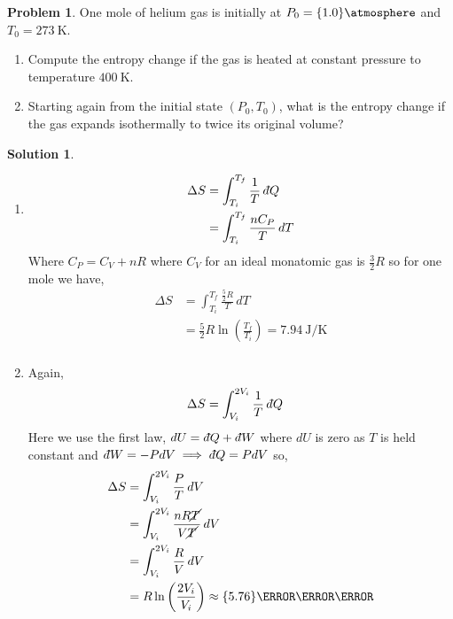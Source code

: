 \documentclass[10pt]{article}
\theoremstyle{definition}
\newtheorem{problem}{Problem}
\newtheorem{soln}{Solution}
\newcommand{\dbar}{d\hspace*{-0.08em}\bar{}\hspace*{0.1em}}
\begin{document}
\begin{problem}
One mole of helium gas is initially at $P_0=\qty{1.0}{\atmosphere}$ and $T_0=\qty{273}{\kelvin}$.
\begin{enumerate}[label=(\alph*)]
  \item Compute the entropy change if the gas is heated at constant pressure to temperature $\qty{400}{\kelvin}$.
  \item Starting again from the initial state $(P_0, T_0)$, what is the entropy change if
        the gas expands isothermally to twice its original volume?
\end{enumerate}
\end{problem}
\begin{soln}~
  \begin{enumerate}[label=(\alph*)]
    \item \begin{align*}
            \Delta S & = \int_{T_i}^{T_f}\frac{1}{T}\,\dbar Q    \\
                     & = \int_{T_i}^{T_f}\frac{nC_P}{T}\,dT
          \end{align*}
          Where $C_P=C_V+nR$ where $C_V$ for an ideal monatomic gas is $\frac{3}{2}R$ so for one mole we have,
          \begin{align*}
            \Delta S & = \int_{T_i}^{T_f}\frac{\frac{5}{2}R}{T}\,dT                                \\
                     & = \frac{5}{2}R\ln\left(\frac{T_f}{T_i}\right)=\qty{7.94}{\joule\per\kelvin} \\
          \end{align*}
    \item Again,
          \begin{align*}
            \Delta S & = \int_{V_i}^{2V_i}\frac{1}{T}\,\dbar Q
          \end{align*}
          Here we use the first law, $dU=\dbar Q+\dbar W$ where $dU$ is zero as $T$ is held constant and $\dbar W=-PdV\implies \dbar Q=PdV$ so,
          \begin{align*}
            \Delta S & = \int_{V_i}^{2V_i}\frac{P}{T}\,dV                                      \\
                     & = \int_{V_i}^{2V_i}\frac{nR\cancel{T}}{V\cancel{T}}\,dV                 \\
                     & = \int_{V_i}^{2V_i}\frac{R}{V}\,dV                                      \\
                     & = R\ln\left(\frac{2V_i}{V_i}\right)\approx\qty{5.76}{\joule\per\kelvin} \\
          \end{align*}
  \end{enumerate}
\end{soln}
\end{document}
